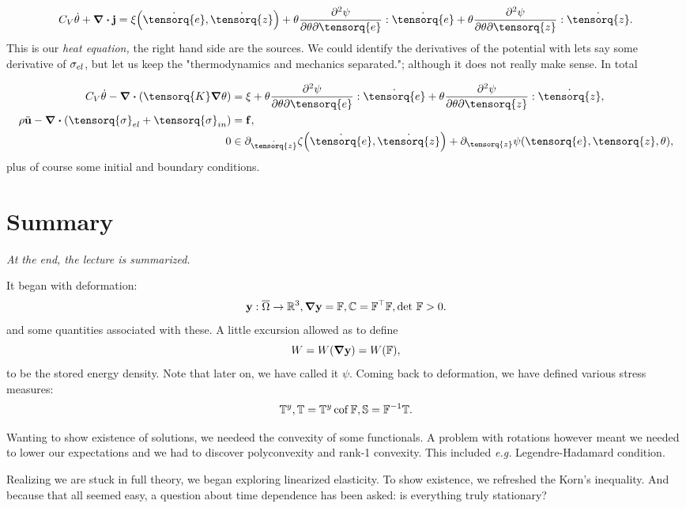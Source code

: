 \documentclass[11pt]{scrartcl} %
\begin{document}
\[
	C_V \dot{\theta} + \divergence{\vb{j}} = \xi\qty(\dot{\tensorq{e}}, \dot{\tensorq{z}}) + \theta \pdv[2]{\psi}{\theta}{\tensorq{e}}: \dot{\tensorq{e}} + \theta \pdv[2]{\psi}{\theta}{\tensorq{z}}: \dot{\tensorq{z}}.
\]
This is our \textit{heat equation,} the right hand side are the sources. We could identify the derivatives of the potential with lets say some derivative of $\mathbb{\sigma}_{el}$, but let us keep the "thermodynamics and mechanics separated."; although it does not really make sense. In total

\begin{align*}
	C_V \dot{\theta} - \divergence{\qty(\tensorq{K} \grad \theta)} & = \xi + \theta \pdv[2]{\psi}{\theta}{\tensorq{e}}:\dot{\tensorq{e}}+ \theta \pdv[2]{\psi}{\theta}{\tensorq{z}}:\dot{\tensorq{z}}, \\
	\rho \ddot{\vb{u}} - \divergence{\qty(\tensorq{\sigma}_{el}+ \tensorq{\sigma}_{in})} &= \vb{f}, \\
	0 &\in \partial_{\dot{\tensorq{z}}}\zeta\qty(\dot{\tensorq{e}}, \dot{\tensorq{z}})+ \partial_{\tensorq{z}}\psi\qty(\tensorq{e}, \tensorq{z}, \theta),
\end{align*}
plus of course some initial and boundary conditions.

\section{Summary}
\label{sec:summary}
\textit{At the end, the lecture is summarized.}


It began with deformation:
\[
	\vb{y}: \overline{\Omega} \to {\mathbb R}^{3}, \grad \vb{y} = \mathbb{F}, \mathbb{C} = \mathbb{F}^\top\mathbb{F}, \det\, \mathbb{F} >0.
\]
and some quantities associated with these. A little excursion allowed as to define
\[
	W = W\qty(\grad \vb{y}) = W\qty(\mathbb{F}),
\]
to be the stored energy density. Note that later on, we have called it $\psi$. 
Coming back to deformation, we have defined various stress measures:
\[
	\mathbb{T}^y, \mathbb{T} = \mathbb{T}^y \operatorname{cof} \mathbb{F}, \mathbb{S} =\mathbb{F}^{-1} \mathbb{T}.
\]

Wanting to show existence of solutions, we needeed the convexity of some functionals. A problem with rotations however meant we needed to lower our expectations and we had to discover polyconvexity and rank-1 convexity. This included \textit{e.g.} Legendre-Hadamard condition.

Realizing we are stuck in full theory, we began exploring linearized elasticity. To show existence, we refreshed the Korn's inequality. And because that all seemed easy, a question about time dependence has been asked: is everything truly stationary?
\end{document}
